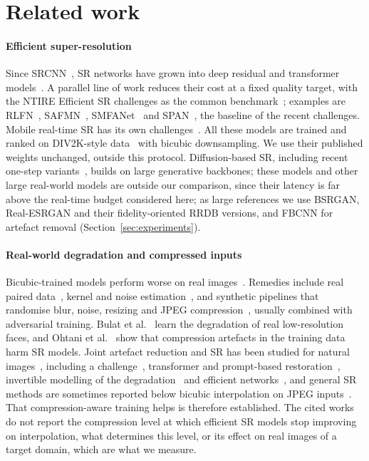 \section{Related work}
\label{sec:related}

\paragraph{Efficient super-resolution} Since SRCNN~\cite{dong2016srcnn}, SR networks have grown into deep residual and transformer models~\cite{lim2017edsr,ledig2017srgan,liang2021swinir}. A parallel line of work reduces their cost at a fixed quality target, with the NTIRE Efficient SR challenges as the common benchmark~\cite{ren2024ntire,ren2025ntire,ren2026ntire}; examples are RLFN~\cite{kong2022rlfn}, SAFMN~\cite{sun2023safmn}, SMFANet~\cite{zheng2024smfanet} and SPAN~\cite{wan2024span}, the baseline of the recent challenges. Mobile real-time SR has its own challenges~\cite{ignatov2021mobile}. All these models are trained and ranked on DIV2K-style data~\cite{agustsson2017div2k} with bicubic downsampling. We use their published weights unchanged, outside this protocol. Diffusion-based SR, including recent one-step variants~\cite{wang2024stablesr,yue2023resshift,lin2024diffbir,wang2024sinsr,wu2024osediff}, builds on large generative backbones; these models and other large real-world models are outside our comparison, since their latency is far above the real-time budget considered here; as large references we use BSRGAN, Real-ESRGAN and their fidelity-oriented RRDB versions, and FBCNN for artefact removal (Section~\ref{sec:experiments}).

\paragraph{Real-world degradation and compressed inputs} Bicubic-trained models perform worse on real images~\cite{lugmayr2019unsupervised}. Remedies include real paired data~\cite{cai2019realsr}, kernel and noise estimation~\cite{bellkligler2019kernelgan,ji2020realsr}, and synthetic pipelines that randomise blur, noise, resizing and JPEG compression~\cite{zhang2021bsrgan,wang2021realesrgan}, usually combined with adversarial training. Bulat et al.~\cite{bulat2018learn} learn the degradation of real low-resolution faces, and Ohtani et al.~\cite{ohtani2024rethinking} show that compression artefacts in the training data harm SR models. Joint artefact reduction and SR has been studied for natural images~\cite{dong2015arcnn,jiang2021fbcnn,chen2018cisrdcnn}, including a challenge~\cite{yang2022aim}, transformer and prompt-based restoration~\cite{li2023hst,li2024promptcir}, invertible modelling of the degradation~\cite{guo2026invertible} and efficient networks~\cite{ma2024senn,kim2024edgecsr}, and general SR methods are sometimes reported below bicubic interpolation on JPEG inputs~\cite{chen2018cisrdcnn}. That compression-aware training helps is therefore established. The cited works do not report the compression level at which efficient SR models stop improving on interpolation, what determines this level, or its effect on real images of a target domain, which are what we measure.

